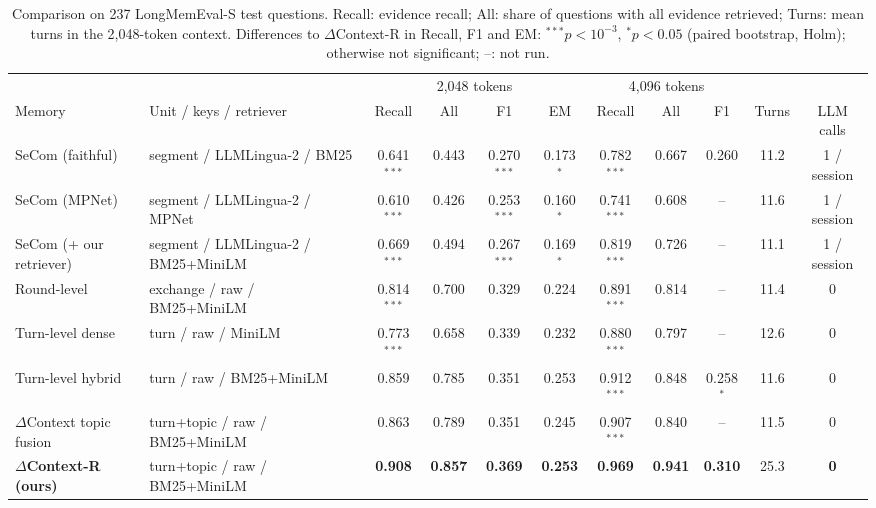 \documentclass[conference]{IEEEtran}
\newcommand{\dc}{$\Delta$Context}
\newcommand{\dcr}{$\Delta$Context-R}
\begin{document}
\begin{table}[t]
\centering
\caption{Comparison on 237 LongMemEval-S test questions. Recall: evidence recall; All: share of questions with all evidence retrieved; Turns: mean turns in the 2,048-token context. Differences to \dcr{} in Recall, F1 and EM: $^{***}p<10^{-3}$, $^{*}p<0.05$ (paired bootstrap, Holm); otherwise not significant; --: not run.}
\label{tab:main}
\footnotesize
\setlength{\tabcolsep}{3.0pt}
\begin{tabular}{@{}llccccccccc@{}}
\toprule
& & \multicolumn{4}{c}{2,048 tokens} & \multicolumn{3}{c}{4,096 tokens} & & \\
\cmidrule(lr){3-6}\cmidrule(lr){7-9}
Memory & Unit / keys / retriever & Recall & All & F1 & EM & Recall & All & F1 & Turns & LLM calls \\
\midrule
SeCom \cite{pan2025secom} (faithful) & segment / LLMLingua-2 / BM25 & 0.641$^{***}$ & 0.443 & 0.270$^{***}$ & 0.173$^{*}$ & 0.782$^{***}$ & 0.667 & 0.260 & 11.2 & 1 / session \\
SeCom (MPNet) & segment / LLMLingua-2 / MPNet & 0.610$^{***}$ & 0.426 & 0.253$^{***}$ & 0.160$^{*}$ & 0.741$^{***}$ & 0.608 & -- & 11.6 & 1 / session \\
SeCom (+ our retriever) & segment / LLMLingua-2 / BM25+MiniLM & 0.669$^{***}$ & 0.494 & 0.267$^{***}$ & 0.169$^{*}$ & 0.819$^{***}$ & 0.726 & -- & 11.1 & 1 / session \\
Round-level \cite{wu2025longmemeval} & exchange / raw / BM25+MiniLM & 0.814$^{***}$ & 0.700 & 0.329 & 0.224 & 0.891$^{***}$ & 0.814 & -- & 11.4 & 0 \\
Turn-level dense & turn / raw / MiniLM & 0.773$^{***}$ & 0.658 & 0.339 & 0.232 & 0.880$^{***}$ & 0.797 & -- & 12.6 & 0 \\
Turn-level hybrid & turn / raw / BM25+MiniLM & 0.859 & 0.785 & 0.351 & 0.253 & 0.912$^{***}$ & 0.848 & 0.258$^{*}$ & 11.6 & 0 \\
\dc{} topic fusion & turn+topic / raw / BM25+MiniLM & 0.863 & 0.789 & 0.351 & 0.245 & 0.907$^{***}$ & 0.840 & -- & 11.5 & 0 \\
\textbf{\dcr{} (ours)} & turn+topic / raw / BM25+MiniLM & \textbf{0.908} & \textbf{0.857} & \textbf{0.369} & \textbf{0.253} & \textbf{0.969} & \textbf{0.941} & \textbf{0.310} & 25.3 & \textbf{0} \\
\bottomrule
\end{tabular}
\end{table}
\end{document}
